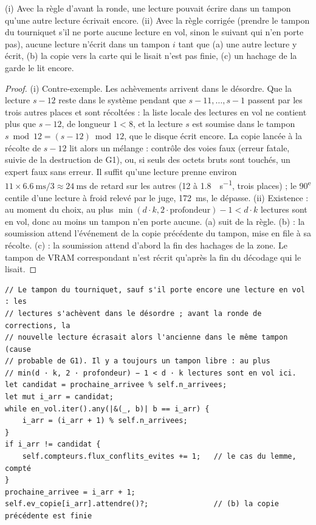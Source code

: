 \begin{lemme}\label{t2e-lem:tampons}
(i) Avec la règle d'avant la ronde, une lecture pouvait écrire dans un tampon qu'une autre lecture écrivait encore. (ii) Avec la règle corrigée (prendre le tampon du tourniquet s'il ne porte aucune lecture en vol, sinon le suivant qui n'en porte pas), aucune lecture n'écrit dans un tampon $i$ tant que (a) une autre lecture y écrit, (b) la copie vers la carte qui le lisait n'est pas finie, (c) un hachage de la garde le lit encore.
\end{lemme}
\begin{proof}
(i) Contre-exemple. Les achèvements arrivent dans le désordre. Que la lecture $s-12$ reste dans le système pendant que $s-11, \dots, s-1$ passent par les trois autres places et sont récoltées : la liste locale des lectures en vol ne contient plus que $s-12$, de longueur $1 < 8$, et la lecture $s$ est soumise dans le tampon $s \bmod 12 = (s-12) \bmod 12$, que le disque écrit encore. La copie lancée à la récolte de $s-12$ lit alors un mélange : contrôle des voies faux (erreur fatale, suivie de la destruction de G1), ou, si seuls des octets bruts sont touchés, un expert faux sans erreur. Il suffit qu'une lecture prenne environ $11 \times \SI{6.6}{\milli\second} / 3 \approx \SI{24}{\milli\second}$ de retard sur les autres (\SI{12}{\Mo} à \SI{1.8}{\Go\per\second}, trois places) \calc ; le 90\textsuperscript{e} centile d'une lecture à froid relevé par le juge, \SI{172}{\milli\second}, le dépasse.
(ii) Existence : au moment du choix, au plus $\min(d\cdot k, 2 \cdot \text{profondeur}) - 1 < d \cdot k$ lectures sont en vol, donc au moins un tampon n'en porte aucune. (a) suit de la règle. (b) : la soumission attend l'événement de la copie précédente du tampon, mise en file à sa récolte. (c) : la soumission attend d'abord la fin des hachages de la zone. Le tampon de VRAM correspondant n'est récrit qu'après la fin du décodage qui le lisait.
\end{proof}

\begin{lstlisting}[language=RustRes, caption={Le choix d'un tampon d'arrivée au préremplissage par flux, après la ronde (\fichier{moteur/crates/trc-ordo/src/lib.rs}, extrait).}, label=t2e-lst:tampon]
// Le tampon du tourniquet, sauf s'il porte encore une lecture en vol : les
// lectures s'achèvent dans le désordre ; avant la ronde de corrections, la
// nouvelle lecture écrasait alors l'ancienne dans le même tampon (cause
// probable de G1). Il y a toujours un tampon libre : au plus
// min(d · k, 2 · profondeur) − 1 < d · k lectures sont en vol ici.
let candidat = prochaine_arrivee % self.n_arrivees;
let mut i_arr = candidat;
while en_vol.iter().any(|&(_, b)| b == i_arr) {
    i_arr = (i_arr + 1) % self.n_arrivees;
}
if i_arr != candidat {
    self.compteurs.flux_conflits_evites += 1;   // le cas du lemme, compté
}
prochaine_arrivee = i_arr + 1;
self.ev_copie[i_arr].attendre()?;               // (b) la copie précédente est finie
\end{lstlisting}

